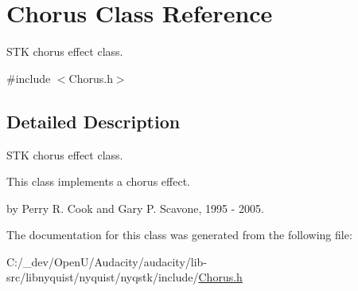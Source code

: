 \hypertarget{class_chorus}{}\section{Chorus Class Reference}
\label{class_chorus}


S\+TK chorus effect class.  




{\ttfamily \#include $<$Chorus.\+h$>$}



\subsection{Detailed Description}
S\+TK chorus effect class. 

This class implements a chorus effect.

by Perry R. Cook and Gary P. Scavone, 1995 -\/ 2005. 

The documentation for this class was generated from the following file\+:\begin{DoxyCompactItemize}
\item 
C\+:/\+\_\+dev/\+Open\+U/\+Audacity/audacity/lib-\/src/libnyquist/nyquist/nyqstk/include/\hyperlink{_chorus_8h}{Chorus.\+h}\end{DoxyCompactItemize}
